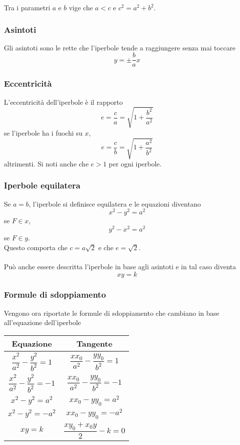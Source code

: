 Tra i parametri $a$ e $b$ vige che $a < c$ e $c^2 = a^2+b^2$.

\subsubsection{Asintoti}
Gli asintoti sono le rette che l'iperbole tende a raggiungere senza mai toccare
\begin{equation*}
y=\pm\frac{b}{a}x
\end{equation*}

	\subsubsection{Eccentricità}
L'eccentricità dell'iperbole è il rapporto
\begin{equation*}
e=\frac{c}{a}=\sqrt{1+\frac{b^2}{a^2}}
\end{equation*}
se l'iperbole ha i fuochi su $x$,
\begin{equation*}
e = \frac{c}{b}=\sqrt{1+\frac{a^2}{b^2}}
\end{equation*}
altrimenti. Si noti anche che $e > 1$ per ogni iperbole.

\subsubsection{Iperbole equilatera}
Se $a=b$, l'iperbole si definisce equilatera e le equazioni diventano 
\begin{equation*}
x^2-y^2=a^2
\end{equation*}
se $F\in x$,
\begin{equation*}
y^2-x^2=a^2
\end{equation*}
se $F\in y$.\\
Questo comporta che $c = a\sqrt{2}$ e che $e=\sqrt{2}$.\\\\
Può anche essere descritta l'iperbole in base agli asintoti e in tal caso diventa
\begin{equation*}
xy=k
\end{equation*}

\subsubsection{Formule di sdoppiamento}
Vengono ora riportate le formule di sdoppiamento che cambiano in base all'equazione dell'iperbole
\begin{center}
	\begin{tabular}{c|c}
		Equazione & Tangente\\\hline
		$\dfrac{x^2}{a^2}-\dfrac{y^2}{b^2}=1$ & $\dfrac{xx_0}{a^2}-\dfrac{yy_0}{b^2}=1$\\\hline
		$\dfrac{x^2}{a^2}-\dfrac{y^2}{b^2}=-1$ & $\dfrac{xx_0}{a^2}-\dfrac{yy_0}{b^2}=-1$\\\hline
		$x^2-y^2=a^2$ & $xx_0-yy_0=a^2$\\\hline
		$x^2-y^2=-a^2$ & $xx_0-yy_0=-a^2$\\\hline
		$xy=k$ & $\dfrac{xy_0+x_0y}{2}-k=0$
	\end{tabular}
\end{center}


